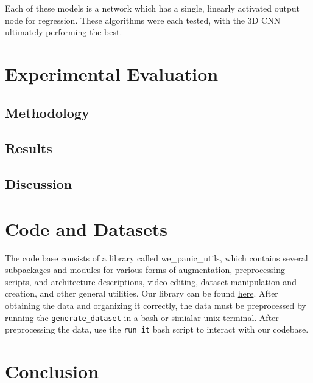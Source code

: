 \documentclass{article}
\begin{document}
\noindent Each of these models is a network which has a single, linearly activated output node for regression. These algorithms were each tested, with the 3D CNN ultimately performing the best.
\section[3]{Experimental Evaluation}
\subsection[3.1] {Methodology}
\subsection[3.2] {Results}
\subsection[3.3] {Discussion}
\section[4]{Code and Datasets}
\noindent The code base consists of a library called we\_panic\_utils, which contains several subpackages and modules for various forms of augmentation, preprocessing scripts, and architecture descriptions, video editing, dataset manipulation and creation, and other general utilities. Our library can be found \href{https://github.com/danielberenberg/DeepLearning-BloodData}{here}. After obtaining the data and organizing it correctly, the data must be preprocessed by running the \texttt{generate\_dataset} in a bash or simialar unix terminal. After preprocessing the data, use the \texttt{run\_it} bash script to interact with our codebase.
\section[5]{Conclusion}
\end{document}
